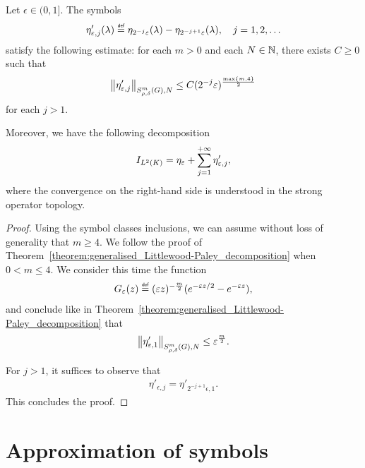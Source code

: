 \begin{corollary}
    Let $\epsilon \in (0, 1]$.
    The symbols
    \begin{align*}
        \eta'_{\epsilon, j}(\lambda) \defeq \eta_{2^{-j} \epsilon}(\lambda) - \eta_{2^{-j + 1} \epsilon}(\lambda),
        \quad j = 1, 2, \dots
    \end{align*}
    satisfy the following estimate:
    for each $m > 0$ and each $N \in \N$, there exists $C \geq 0$ such that
    \begin{align*}
        \SymbolSemiNorm m {\rho, \delta} N {\eta'_{\epsilon, j}}
        \leq C (2^{-j} \epsilon)^\frac {\max \{m, 4\}} 2
    \end{align*}
    for each $j > 1$.

    Moreover,
    we have the following decomposition
    \begin{align*}
        \Id {\Lebesgue 2 \CompactGroup} =
        \eta_\epsilon + \sum_{j = 1}^{+\infty} \eta'_{\epsilon, j},
    \end{align*}
    where the convergence on the right-hand side is understood in the strong operator topology.
\end{corollary}
\begin{proof}
    Using the symbol classes inclusions,
    we can assume without loss of generality that $m \geq 4$.
    We follow the proof of Theorem~\ref{theorem:generalised_Littlewood-Paley_decomposition} when $0 < m \leq 4$.
    We consider this time the function
    \begin{align*}
        G_\epsilon(z) \defeq (\epsilon z)^{-\frac m 2}
        (\e^{-\epsilon z/2} - \e^{-\epsilon z}),
    \end{align*}
    and conclude like in Theorem~\ref{theorem:generalised_Littlewood-Paley_decomposition} that
    \begin{align*}
        \SymbolSemiNorm m {\rho, \delta} N {\eta'_{\epsilon, 1}} \leq \epsilon^\frac m 2.
    \end{align*}

    For $j > 1$,
    it suffices to observe that
    \begin{align*}
        \eta'_{\epsilon, j}
        = \eta'_{2^{-j + 1} \epsilon, 1}.
    \end{align*}
    This concludes the proof.
\end{proof}

\section{Approximation of symbols}

